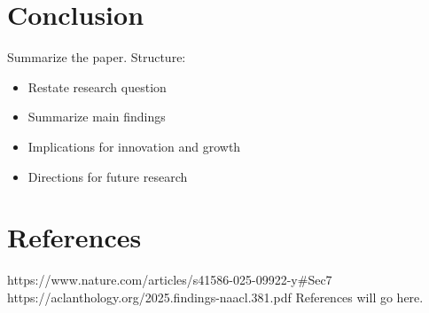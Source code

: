 \documentclass[11pt]{article}
\begin{document}
\section{Conclusion}
Summarize the paper.
Structure:
\begin{itemize}
\item Restate research question
\item Summarize main findings
\item Implications for innovation and growth
\item Directions for future research
\end{itemize}
\section*{References}
https://www.nature.com/articles/s41586-025-09922-y\#Sec7
https://aclanthology.org/2025.findings-naacl.381.pdf
References will go here.
\end{document}
